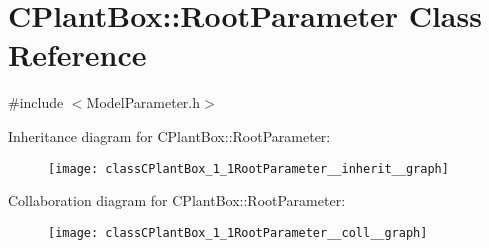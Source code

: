 \hypertarget{classCPlantBox_1_1RootParameter}{}\section{C\+Plant\+Box\+:\+:Root\+Parameter Class Reference}
\label{classCPlantBox_1_1RootParameter}


{\ttfamily \#include $<$Model\+Parameter.\+h$>$}



Inheritance diagram for C\+Plant\+Box\+:\+:Root\+Parameter\+:\nopagebreak
\begin{figure}[H]
\begin{center}
\leavevmode
\texttt{[image: classCPlantBox\_1\_1RootParameter\_\_inherit\_\_graph]}
\end{center}
\end{figure}


Collaboration diagram for C\+Plant\+Box\+:\+:Root\+Parameter\+:\nopagebreak
\begin{figure}[H]
\begin{center}
\leavevmode
\texttt{[image: classCPlantBox\_1\_1RootParameter\_\_coll\_\_graph]}
\end{center}
\end{figure}
